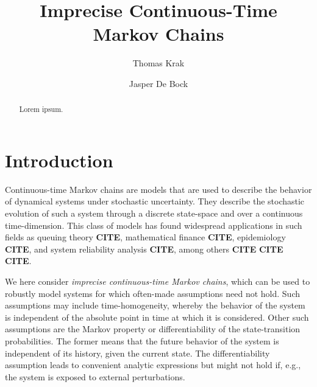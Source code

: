 \documentclass[10pt,a4paper]{paper}
\title{Imprecise Continuous-Time Markov Chains}
\author{Thomas Krak \and Jasper De Bock}
\theoremstyle{definition}
\begin{document}


\date{}
\maketitle

\begin{abstract}
Lorem ipsum.
\end{abstract}

\section{Introduction}\label{sec:introduction}

Continuous-time Markov chains are models that are used to describe the behavior of dynamical systems under stochastic uncertainty. They describe the stochastic evolution of such a system through a discrete state-space and over a continuous time-dimension. This class of models has found widespread applications in such fields as queuing theory {\bf CITE}, mathematical finance {\bf CITE}, epidemiology {\bf CITE}, and system reliability analysis {\bf CITE}, among others {\bf CITE} {\bf CITE} {\bf CITE}.

We here consider \emph{imprecise continuous-time Markov chains}, which can be used to robustly model systems for which often-made assumptions need not hold. Such assumptions may include time-homogeneity, whereby the behavior of the system is independent of the absolute point in time at which it is considered. Other such assumptions are the Markov property or differentiability of the state-transition probabilities. The former means that the future behavior of the system is independent of its history, given the current state. The differentiability assumption leads to convenient analytic expressions but might not hold if, e.g., the system is exposed to external perturbations. 
\end{document}
